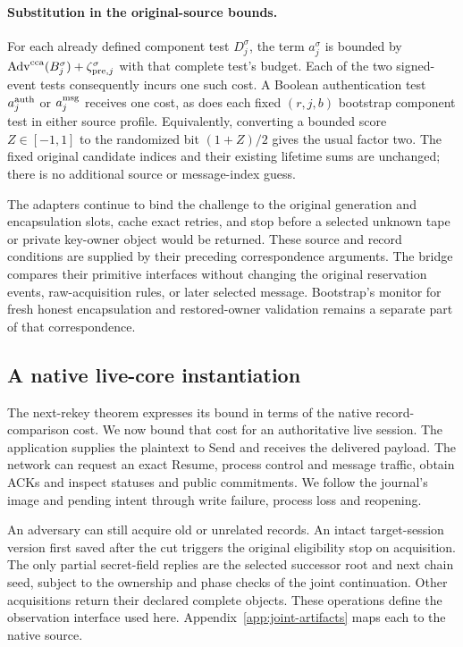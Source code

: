 \documentclass[pdflatex]{sn-jnl}
\theoremstyle{thmstyleone}
\theoremstyle{thmstylethree}
\theoremstyle{thmstyletwo}
\begin{document}
\paragraph{Substitution in the original-source bounds.}
For each already defined component test $D_j^\sigma$, the term
$a_j^\sigma$ is bounded by
$\operatorname{Adv}^{\rm cca}(B_j^\sigma)
 +\zeta_{{\rm pre},j}^{\sigma}$ with that complete test's budget.
Each of the two signed-event tests consequently incurs one such cost.
A Boolean authentication test $a_j^{\rm auth}$ or $a_j^{\rm msg}$
receives one cost, as does each fixed $(r,j,b)$ bootstrap component test
in either source profile. Equivalently, converting a bounded score
$Z\in[-1,1]$ to the randomized bit $(1+Z)/2$ gives the usual factor two.
The fixed original candidate indices and their existing lifetime sums
are unchanged; there is no additional source or message-index guess.

The adapters continue to bind the challenge to the original generation
and encapsulation slots, cache exact retries, and stop before a selected
unknown tape or private key-owner object would be returned. These source and record
conditions are supplied by their preceding correspondence arguments.
The bridge compares their primitive interfaces without changing the
original reservation events, raw-acquisition rules, or later selected
message. Bootstrap's monitor for fresh honest encapsulation and
restored-owner validation remains a separate part of that correspondence.
\subsection{A native live-core instantiation}
\label{sec:live-core-instantiation}

The next-rekey theorem expresses its bound in terms of the native
record-comparison cost. We now bound that cost for an authoritative live
session. The application supplies the plaintext to Send and receives the
delivered payload. The network can request an
exact Resume, process control and message traffic, obtain ACKs and
inspect statuses and public commitments. We follow the journal's
image and pending intent through write failure, process loss
and reopening.

An adversary can still acquire old or unrelated records. An intact
target-session version first saved after the cut triggers the original
eligibility stop on acquisition. The only partial secret-field replies
are the selected successor root and next chain seed, subject to the
ownership and phase checks of the joint continuation. Other acquisitions
return their declared complete objects. These operations define the
observation interface used here. Appendix~\ref{app:joint-artifacts}
maps each to the native source.
\end{document}
